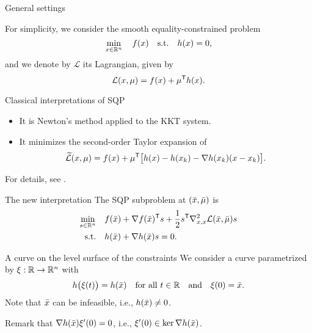 \documentclass[
]{talk}
\newcommand*{\ceq}{h}
\newcommand*{\iter}[1][]{x\ifblank{#1}{}{_{#1}}}
\newcommand*{\lag}{\mathcal{L}}
\newcommand*{\lagalt}{\widetilde{\mathcal{L}}}
\newcommand*{\lmeq}[1][]{\mu\ifblank{#1}{}{_{#1}}}
\newcommand*{\obj}{f}
\newcommand*{\step}[1][]{s\ifblank{#1}{}{_{#1}}}
\begin{document}
\begin{frame}{General settings}

    For simplicity, we consider the \alert{smooth} equality-constrained problem
    \begin{equation*}
        \min_{\iter \in \R^n} \quad \obj(\iter) \quad \textrm{s.t.} \quad \ceq(\iter) = 0\text{,}
    \end{equation*}
    and we denote by $\lag$ its \alert{Lagrangian}, given by
    \begin{equation*}
        \lag(\iter, \lmeq) = \obj(\iter) + \lmeq^{\T} \ceq(\iter)\text{.}
    \end{equation*}

    \begin{block}{Classical interpretations of SQP}
        \begin{itemize}
            \item It is \alert{Newton}'s method applied to the KKT system.
            \item It minimizes the second-order Taylor expansion of
            \begin{equation*}
                \lagalt(\iter, \lmeq) = \obj(\iter) + \mu^{\T} \big[\ceq(\iter) - \ceq(\iter[k]) - \nabla \ceq(\iter[k]) (\iter - \iter[k])\big]\text{.}
            \end{equation*}
        \end{itemize}
        For details, see \textcite[\S\ 4.1.3]{Ragonneau_2022}.
    \end{block}
\end{frame}

\begin{frame}{The new interpretation}
    The SQP subproblem at $(\bar{\iter}, \bar{\lmeq})$ is
    \begin{equation*}
        \begin{aligned}
            \min_{\step \in \R^n}   & \quad \obj(\bar{\iter}) + \nabla \obj(\bar{\iter})^{\T} \step + \frac{1}{2} \step^{\T} \nabla_{\iter, \iter}^2 \lag(\bar{\iter}, \bar{\lmeq}) \step\\
            \textrm{s.t.}           & \quad \ceq(\bar{\iter}) + \nabla \ceq(\bar{\iter}) \step = 0\text{.}
        \end{aligned}
    \end{equation*}

    \begin{block}{A curve on the level surface of the constraints}
        We consider a \alert{curve} parametrized by $\xi : \mathbb{R} \to \mathbb{R}^n$ with
        \begin{equation*}
            \ceq\big(\xi(t)\big) = \ceq(\bar{\iter}) \quad \text{for all $t \in \R$} \quad \text{and} \quad \xi(0) = \bar{\iter}\text{.}
        \end{equation*}
        Note that $\bar{\iter}$ can be \alert{infeasible}, i.e., $\ceq(\bar{\iter}) \neq 0$.
    \end{block}

    \medskip

    Remark that $\nabla \ceq(\bar{\iter}) \xi'(0) = 0$, i.e., $\xi'(0) \in \ker \nabla \ceq(\bar{\iter})$.
\end{frame}
\end{document}
